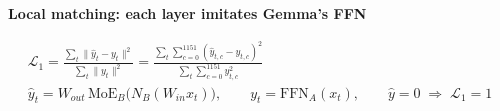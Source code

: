 \documentclass[border=40pt]{standalone}
\begin{document}
\begin{minipage}{26cm}
{\sffamily\bfseries\Large\color{muted} Local matching: each layer imitates Gemma's FFN}\par\vspace{-14pt}
{\LARGE
\begin{gather*}
\mathcal{L}_1 = \frac{\sum_t \lVert \hat y_t - y_t\rVert^{2}}{\sum_t \lVert y_t\rVert^{2}}
= \frac{\sum_t \sum_{c=0}^{1151} (\hat y_{t,c} - y_{t,c})^{2}}{\sum_t \sum_{c=0}^{1151} y_{t,c}^{2}}
\\[6pt]
\hat y_t = W_{out}\,\mathrm{MoE}_B\big(N_B(W_{in}x_t)\big), \qquad y_t = \mathrm{FFN}_A(x_t), \qquad \hat y = 0 \;\Rightarrow\; \mathcal{L}_1 = 1
\end{gather*}}
\end{minipage}
\end{document}

